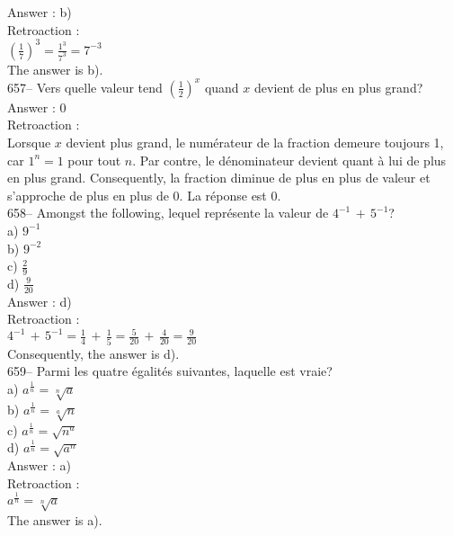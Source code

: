 ﻿\documentclass[letterpaper, 12pt]{article}
\begin{document}
Answer : b)\\

Retroaction : \\[2mm]
$(\frac{1}{7})^{3}=\frac{1^{3}}{7^{3}}=7^{-3}$\\[2mm]
The answer is b).\\

657-- Vers quelle valeur tend $\left(\frac12\right)^x$ quand $x$
devient de plus
en plus grand?\\

Answer : 0\\

Retroaction : \\
Lorsque $x$ devient plus grand, le num\'erateur de la fraction demeure
toujours 1, car $1^{n}=1$ pour tout $n$.  Par contre, le d\'enominateur
devient quant \`a lui de plus en plus grand.  Consequently, la fraction
diminue de plus en plus de valeur et s'approche de plus en plus de 0.  La
r\'eponse est 0.  \\

658-- Amongst the following, lequel repr\'esente la valeur de
$4^{-1}\,+\,5^{-1}$?\\
a) $9^{-1}$\\[2mm]
b) $9^{-2}$\\[2mm]
c) $\frac{2}{9}$\\[2mm]
d) $\frac{9}{20}$\\

Answer : d)\\

Retroaction : \\[2mm]
$4^{-1}\,+\,5^{-1}=\frac{1}{4}\,+\,\frac{1}{5}=\frac{5}{20}\,+\,\frac{4}{20}=\frac{9}{20}$\\[2mm]
Consequently, the answer is d).\\

659-- Parmi les quatre \'egalit\'es suivantes, laquelle est vraie?\\
a) $a^{\frac{1}{n}}=\sqrt[n]{a}$\\[2mm]
b) $a^{\frac{1}{n}}=\sqrt[a]{n}$\\[2mm]
c) $a^{\frac{1}{n}}=\sqrt{n^{a}}$\\[2mm]
d) $a^{\frac{1}{n}}=\sqrt{a^{n}}$\\

Answer : a)\\

Retroaction : \\
$a^{\frac{1}{n}}=\sqrt[n]{a}$\\
The answer is a).\\
\end{document}
